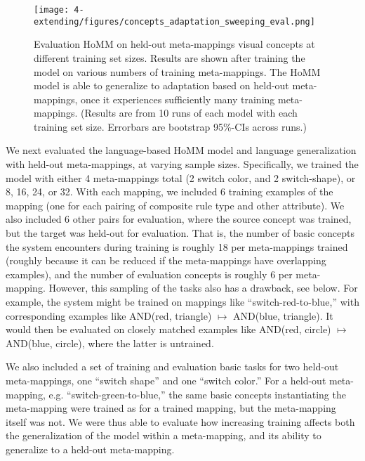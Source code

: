 \begin{figure}[htb]
\centering
\texttt{[image: 4-extending/figures/concepts\_adaptation\_sweeping\_eval.png]}
\caption[Evaluating HoMM on held-out meta-mappings at different training set sizes.]{Evaluation HoMM on held-out meta-mappings visual concepts at different training set sizes. Results are shown after training the model on various numbers of training meta-mappings. The HoMM model is able to generalize to adaptation based on held-out meta-mappings, once it experiences sufficiently many training meta-mappings. (Results are from 10 runs of each model with each training set size. Errorbars are bootstrap 95\%-CIs across runs.)} \label{fig:extending_concepts_sweeping_results_eval}
\end{figure}

We next evaluated the language-based HoMM model and language generalization with held-out meta-mappings, at varying sample sizes. Specifically, we trained the model with either 4 meta-mappings total (2 switch color, and 2 switch-shape), or 8, 16, 24, or 32. With each mapping, we included 6 training examples of the mapping (one for each pairing of composite rule type and other attribute). We also included 6 other pairs for evaluation, where the source concept was trained, but the target was held-out for evaluation. That is, the number of basic concepts the system encounters during training is roughly 18 per meta-mappings trained (roughly because it can be reduced if the meta-mappings have overlapping examples), and the number of evaluation concepts is roughly 6 per meta-mapping. However, this sampling of the tasks also has a drawback, see below. For example, the system might be trained on mappings like ``switch-red-to-blue,'' with corresponding examples like AND(red, triangle) \(\mapsto\) AND(blue, triangle). It would then be evaluated on closely matched examples like AND(red, circle) \(\mapsto\) AND(blue, circle), where the latter is untrained. \par

We also included a set of training and evaluation basic tasks for two held-out meta-mappings, one ``switch shape'' and one ``switch color.'' For a held-out meta-mapping, e.g. ``switch-green-to-blue,'' the same basic concepts instantiating the meta-mapping were trained as for a trained mapping, but the meta-mapping itself was not. We were thus able to evaluate how increasing training affects both the generalization of the model within a meta-mapping, and its ability to generalize to a held-out meta-mapping. \par

